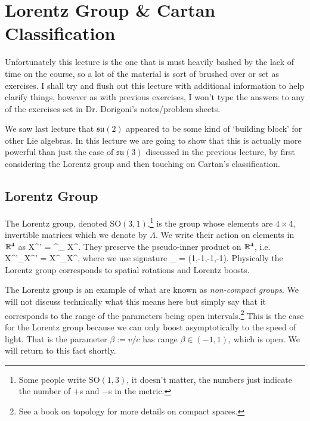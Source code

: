 \chapter{Lorentz Group \& Cartan Classification}

\br 
    Unfortunately this lecture is the one that is must heavily bashed by the lack of time on the course, so a lot of the material is sort of brushed over or set as exercises. I shall try and flush out this lecture with additional information to help clarify things, however as with previous exercises, I won't type the answers to any of the exercises set in Dr. Dorigoni's notes/problem sheets.
\er 

We saw last lecture that $\mathfrak{su}(2)$ appeared to be some kind of `building block' for other Lie algebras. In this lecture we are going to show that this is actually more powerful than just the case of $\mathfrak{su}(3)$ discussed in the previous lecture, by first considering the Lorentz group and then touching on Cartan's classification.

\section{Lorentz Group}

The Lorentz group, denoted SO$(3,1)$,\footnote{Some people write SO$(1,3)$, it doesn't matter, the numbers just indicate the number of $+$s and $-$s in the metric.} is the group whose elements are $4\times 4$, invertible matrices which we denote by $\Lambda$. We write their action on elements in $\mathbb{R}^4$ as
\bse 
    X^{'\mu} = {\Lambda^{\mu}}_{\nu} X^{\nu}.
\ese 
They preserve the pseudo-inner product on $\mathbb{R}^4$, i.e. 
\be
\label{eqn:X'etaX'=XetaX}
    X^{'\mu}\eta_{\mu\nu}X^{'\nu} = X^{\mu}\eta_{\mu\nu}X^{\nu},
\ee 
where we use signature
\bse 
    \eta_{\mu\nu} = (1,-1,-1,-1).
\ese 
Physically the Lorentz group corresponds to spatial rotations and Lorentz boosts.

\br 
\label{rem:NonCompactGroups}
    The Lorentz group is an example of what are known as \textit{non-compact groups}. We will not discuss technically what this means here but simply say that it corresponds to the range of the parameters being open intervals.\footnote{See a book on topology for more details on compact spaces.} This is the case for the Lorentz group because we can only boost asymptotically to the speed of light. That is the parameter $\beta := v/c$ has range $\beta\in(-1,1)$, which is open. We will return to this fact shortly.
\er 

